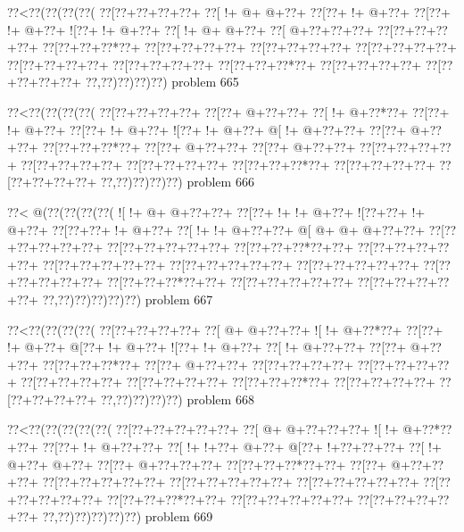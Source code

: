 \vbox{\vbox{\goo
\0??<\0??(\0??(\0??(\0??(
\0??[\0??+\0??+\0??+\0??+
\0??[\- !+\- @+\- @+\0??+
\0??[\0??+\- !+\- @+\0??+
\0??[\0??+\- !+\- @+\0??+
\- ![\0??+\- !+\- @+\0??+
\0??[\- !+\- @+\- @+\0??+
\0??[\- @+\0??+\0??+\0??+
\0??[\0??+\0??+\0??+\0??+
\0??[\0??+\0??+\0??*\0??+
\0??[\0??+\0??+\0??+\0??+
\0??[\0??+\0??+\0??+\0??+
\0??[\0??+\0??+\0??+\0??+
\0??[\0??+\0??+\0??+\0??+
\0??[\0??+\0??+\0??+\0??+
\0??[\0??+\0??+\0??*\0??+
\0??[\0??+\0??+\0??+\0??+
\0??[\0??+\0??+\0??+\0??+
\0??,\0??)\0??)\0??)\0??)
}
\hfil problem 665\hfil\break
}

\vbox{\vbox{\goo
\0??<\0??(\0??(\0??(\0??(
\0??[\0??+\0??+\0??+\0??+
\0??[\0??+\- @+\0??+\0??+
\0??[\- !+\- @+\0??*\0??+
\0??[\0??+\- !+\- @+\0??+
\0??[\0??+\- !+\- @+\0??+
\- ![\0??+\- !+\- @+\0??+
\- @[\- !+\- @+\0??+\0??+
\0??[\0??+\- @+\0??+\0??+
\0??[\0??+\0??+\0??*\0??+
\0??[\0??+\- @+\0??+\0??+
\0??[\0??+\- @+\0??+\0??+
\0??[\0??+\0??+\0??+\0??+
\0??[\0??+\0??+\0??+\0??+
\0??[\0??+\0??+\0??+\0??+
\0??[\0??+\0??+\0??*\0??+
\0??[\0??+\0??+\0??+\0??+
\0??[\0??+\0??+\0??+\0??+
\0??,\0??)\0??)\0??)\0??)
}
\hfil problem 666\hfil\break
}

\vbox{\vbox{\goo
\0??<\- @(\0??(\0??(\0??(\0??(
\- ![\- !+\- @+\- @+\0??+\0??+
\0??[\0??+\- !+\- !+\- @+\0??+
\- ![\0??+\0??+\- !+\- @+\0??+
\0??[\0??+\0??+\- !+\- @+\0??+
\0??[\- !+\- !+\- @+\0??+\0??+
\- @[\- @+\- @+\- @+\0??+\0??+
\0??[\0??+\0??+\0??+\0??+\0??+
\0??[\0??+\0??+\0??+\0??+\0??+
\0??[\0??+\0??+\0??*\0??+\0??+
\0??[\0??+\0??+\0??+\0??+\0??+
\0??[\0??+\0??+\0??+\0??+\0??+
\0??[\0??+\0??+\0??+\0??+\0??+
\0??[\0??+\0??+\0??+\0??+\0??+
\0??[\0??+\0??+\0??+\0??+\0??+
\0??[\0??+\0??+\0??*\0??+\0??+
\0??[\0??+\0??+\0??+\0??+\0??+
\0??[\0??+\0??+\0??+\0??+\0??+
\0??,\0??)\0??)\0??)\0??)\0??)
}
\hfil problem 667\hfil\break
}

\vbox{\vbox{\goo
\0??<\0??(\0??(\0??(\0??(
\0??[\0??+\0??+\0??+\0??+
\0??[\- @+\- @+\0??+\0??+
\- ![\- !+\- @+\0??*\0??+
\0??[\0??+\- !+\- @+\0??+
\- @[\0??+\- !+\- @+\0??+
\- ![\0??+\- !+\- @+\0??+
\0??[\- !+\- @+\0??+\0??+
\0??[\0??+\- @+\0??+\0??+
\0??[\0??+\0??+\0??*\0??+
\0??[\0??+\- @+\0??+\0??+
\0??[\0??+\0??+\0??+\0??+
\0??[\0??+\0??+\0??+\0??+
\0??[\0??+\0??+\0??+\0??+
\0??[\0??+\0??+\0??+\0??+
\0??[\0??+\0??+\0??*\0??+
\0??[\0??+\0??+\0??+\0??+
\0??[\0??+\0??+\0??+\0??+
\0??,\0??)\0??)\0??)\0??)
}
\hfil problem 668\hfil\break
}

\vbox{\vbox{\goo
\0??<\0??(\0??(\0??(\0??(\0??(
\0??[\0??+\0??+\0??+\0??+\0??+
\0??[\- @+\- @+\0??+\0??+\0??+
\- ![\- !+\- @+\0??*\0??+\0??+
\0??[\0??+\- !+\- @+\0??+\0??+
\0??[\- !+\- !+\0??+\- @+\0??+
\- @[\0??+\- !+\0??+\0??+\0??+
\0??[\- !+\- @+\0??+\- @+\0??+
\0??[\0??+\- @+\0??+\0??+\0??+
\0??[\0??+\0??+\0??*\0??+\0??+
\0??[\0??+\- @+\0??+\0??+\0??+
\0??[\0??+\0??+\0??+\0??+\0??+
\0??[\0??+\0??+\0??+\0??+\0??+
\0??[\0??+\0??+\0??+\0??+\0??+
\0??[\0??+\0??+\0??+\0??+\0??+
\0??[\0??+\0??+\0??*\0??+\0??+
\0??[\0??+\0??+\0??+\0??+\0??+
\0??[\0??+\0??+\0??+\0??+\0??+
\0??,\0??)\0??)\0??)\0??)\0??)
}
\hfil problem 669\hfil\break
}

